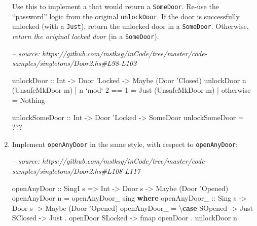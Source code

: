 \documentclass[]{article}
\newenvironment{Shaded}{}{}
\newcommand{\CommentTok}[1]{\textcolor[rgb]{0.38,0.63,0.69}{\textit{#1}}}
\newcommand{\DataTypeTok}[1]{\textcolor[rgb]{0.56,0.13,0.00}{#1}}
\newcommand{\DecValTok}[1]{\textcolor[rgb]{0.25,0.63,0.44}{#1}}
\newcommand{\FunctionTok}[1]{\textcolor[rgb]{0.02,0.16,0.49}{#1}}
\newcommand{\KeywordTok}[1]{\textcolor[rgb]{0.00,0.44,0.13}{\textbf{#1}}}
\newcommand{\NormalTok}[1]{#1}
\newcommand{\OperatorTok}[1]{\textcolor[rgb]{0.40,0.40,0.40}{#1}}
\newcommand{\OtherTok}[1]{\textcolor[rgb]{0.00,0.44,0.13}{#1}}
\begin{document}
\begin{enumerate}
  Use this to implement a that would return a \texttt{SomeDoor}. Re-use the
  ``password'' logic from the original \texttt{unlockDoor}. If the door is
  successfully unlocked (with a \texttt{Just}), return the unlocked door in a
  \texttt{SomeDoor}. Otherwise, \emph{return the original locked door} (in a
  \texttt{SomeDoor}).

\begin{Shaded}
\begin{Highlighting}[]
\CommentTok{-- source: https://github.com/mstksg/inCode/tree/master/code-samples/singletons/Door2.hs#L98-L103}

\OtherTok{unlockDoor ::} \DataTypeTok{Int} \OtherTok{->} \DataTypeTok{Door} \DataTypeTok{'Locked} \OtherTok{->} \DataTypeTok{Maybe}\NormalTok{ (}\DataTypeTok{Door} \DataTypeTok{'Closed}\NormalTok{)}
\NormalTok{unlockDoor n (}\DataTypeTok{UnsafeMkDoor}\NormalTok{ m)}
    \OperatorTok{|}\NormalTok{ n }\OtherTok{`mod`} \DecValTok{2} \OperatorTok{==} \DecValTok{1} \OtherTok{=} \DataTypeTok{Just}\NormalTok{ (}\DataTypeTok{UnsafeMkDoor}\NormalTok{ m)}
    \OperatorTok{|} \FunctionTok{otherwise}      \OtherTok{=} \DataTypeTok{Nothing}

\OtherTok{unlockSomeDoor ::} \DataTypeTok{Int} \OtherTok{->} \DataTypeTok{Door} \DataTypeTok{'Locked} \OtherTok{->} \DataTypeTok{SomeDoor}
\NormalTok{unlockSomeDoor }\OtherTok{=} \OperatorTok{???}
\end{Highlighting}
\end{Shaded}
\item
  Implement \texttt{openAnyDoor\textquotesingle{}} in the same style, with
  respect to \texttt{openAnyDoor}:

\begin{Shaded}
\begin{Highlighting}[]
\CommentTok{-- source: https://github.com/mstksg/inCode/tree/master/code-samples/singletons/Door2.hs#L108-L117}

\OtherTok{openAnyDoor ::} \DataTypeTok{SingI}\NormalTok{ s }\OtherTok{=>} \DataTypeTok{Int} \OtherTok{->} \DataTypeTok{Door}\NormalTok{ s }\OtherTok{->} \DataTypeTok{Maybe}\NormalTok{ (}\DataTypeTok{Door} \DataTypeTok{'Opened}\NormalTok{)}
\NormalTok{openAnyDoor n }\OtherTok{=}\NormalTok{ openAnyDoor_ sing}
  \KeywordTok{where}
\OtherTok{    openAnyDoor_ ::} \DataTypeTok{Sing}\NormalTok{ s }\OtherTok{->} \DataTypeTok{Door}\NormalTok{ s }\OtherTok{->} \DataTypeTok{Maybe}\NormalTok{ (}\DataTypeTok{Door} \DataTypeTok{'Opened}\NormalTok{)}
\NormalTok{    openAnyDoor_ }\OtherTok{=}\NormalTok{ \textbackslash{}}\KeywordTok{case}
      \DataTypeTok{SOpened} \OtherTok{->} \DataTypeTok{Just}
      \DataTypeTok{SClosed} \OtherTok{->} \DataTypeTok{Just} \OperatorTok{.}\NormalTok{ openDoor}
      \DataTypeTok{SLocked} \OtherTok{->} \FunctionTok{fmap}\NormalTok{ openDoor }\OperatorTok{.}\NormalTok{ unlockDoor n}


\end{Highlighting}
\end{Shaded}
\end{enumerate}
\end{document}
